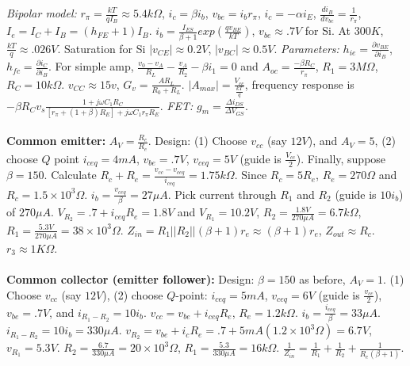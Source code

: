 \emph{Bipolar model: }
$r_{\pi} = {\frac {kT}{qI_B}} \approx 5.4 k \Omega$, $i_c= \beta i_b$, $v_{be}= i_b r_{\pi}$,
$i_c= - \alpha i_E$, ${\frac {d i_B}{dv_{bc}}}= {\frac 1 {r_{\pi}}}$,
$I_e= I_C + I_B= (h_{FE}+1)I_B$.
$i_b= {\frac {I_{ES} } {\beta + 1}} exp({\frac {qv_{BE}} {kT}})$, $v_{be} \approx .7V$ for Si.
At $300K$, ${\frac {kT}{q}} \approx .026V$.  Saturation for Si 
$|v_{CE}| \approx 0.2V$, $|v_{BC}| \approx 0.5V$. 
\emph{Parameters:} $h_{ie}= {\frac {\partial v_{BE}} {\partial i_B}}$,
$h_{fc}= {\frac {\partial i_C} {\partial i_B}}$.
For simple amp, ${\frac {v_0 - v_A} {R_L}} - {\frac {v_A} {R_2}} - \beta i_1 = 0$ and
$A_{oc}= {\frac {- \beta R_C} {r_{\pi}}}$, 
$R_1= 3 M \Omega$, $R_C = 10 k \Omega$. $v_{CC} \approx 15v$,
$G_v= {\frac {A R_L} {R_0 + R_L}}$.  $|A_{max}|= {\frac {V_{cc}} {\frac {kT} {q}}}$,
frequency response is $- \beta R_C v_s {\frac {1+j \omega C_1 R_C}
{[r_{\pi}+ (1+\beta)R_E]+j \omega C_1 r_{\pi} R_E}}$.  
\emph{FET:} $g_m= {\frac {\Delta i_{DS}} {\Delta V_{GS}}}$.
\\
\\
{\bf Common emitter:} 
$A_V = {\frac {R_c} {R_e}}$.
Design: (1) Choose $v_{cc}$ (say $12V$), and $A_V= 5$, 
(2) choose $Q$ point $i_{ceq} = 4 mA$, $v_{be}=.7V$, $v_{ceq}=5V$ (guide is ${\frac {V_{cc}} 2}$). Finally,
suppose $\beta = 150$.
Calculate $R_c + R_e = {\frac {v_{cc} - v_{ceq}} {i_{ceq}}} = 1.75 k \Omega$.
Since $R_c = 5 R_e$, $R_e = 270 \Omega$ and
$R_c = 1.5 \times 10^3 \Omega$.  $i_b = {\frac {v_{ceq}} {\beta}} = 27 \mu A$.
Pick current through $R_1$ and $R_2$ (guide is $10 i_b$) of $270 \mu A$.
$V_{R_2} = .7 + i_{ceq}R_e = 1.8V$ and $V_{R_1} = 10.2V$,
$R_2 = {\frac {1.8V} {270 \mu A}}= 6.7 k \Omega$,
$R_1 = {\frac {5.3V} {270 \mu A}}= 
38 \times 10^3 \Omega$.
$Z_{in}= R_1 || R_2 || (\beta+1) r_e \approx(\beta+1)r_e$, $Z_{out} \approx R_c$.  $r_3 \approx 1K\Omega$.
\\
\\
{\bf Common collector (emitter follower):} 
Design: $\beta = 150$ as before, $A_V = 1$.
(1) Choose $v_{cc}$ (say $12V$), (2) choose $Q$-point:
$i_{ceq}= 5 mA$, $v_{ceq}= 6V$  (guide is ${\frac {v_{cc}} 2}$), $v_{be}=.7V$,
and $i_{R_1-R_2} = 10 i_b$.
$v_{cc} = v_{be} + i_{ceq} R_e$, $R_e= 1.2 k \Omega$.
$i_b = {\frac {i_{ceq}} {\beta}} = 33 \mu A$.
$i_{R_1-R_2}= 10 i_b = 330 \mu A$.
$v_{R_2} = v_{be} + i_c R_e = .7 + 5 mA (1.2 \times 10^3 \Omega) = 6.7V$,
$v_{R_1}= 5.3V$.
$R_2 = {\frac {6.7} {330 \mu A}} = 20 \times 10^3 \Omega$,
$R_1 = {\frac {5.3} {330 \mu A}} = 16k \Omega$.
${\frac 1 {Z_{in}}} = {\frac 1 {R_{1}}} +
{\frac 1 {R_{2}}} + {\frac 1 {R_{e} ( \beta + 1)}}$.
